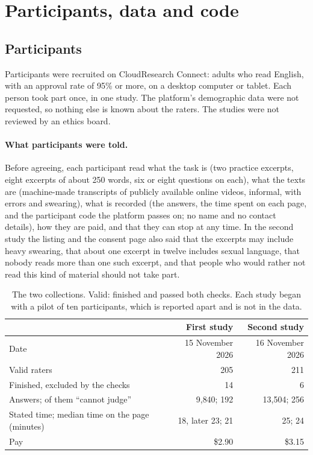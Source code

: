 \section{Participants, data and code}\label{sec:materials}

\subsection{Participants}\label{sec:participants}

Participants were recruited on CloudResearch Connect: adults who read English, with an approval rate of 95\% or
more, on a desktop computer or tablet. Each person took part once, in one study. The platform's demographic
data were not requested, so nothing else is known about the raters. The studies were not reviewed by an ethics
board.

\paragraph{What participants were told.} Before agreeing, each participant read what the task is (two practice
excerpts, eight excerpts of about 250 words, six or eight questions on each), what the texts are (machine-made
transcripts of publicly available online videos, informal, with errors and swearing), what is recorded (the
answers, the time spent on each page, and the participant code the platform passes on; no name and no contact
details), how they are paid, and that they can stop at any time. In the second study the listing and the
consent page also said that the excerpts may include heavy swearing, that about one excerpt in twelve includes
sexual language, that nobody reads more than one such excerpt, and that people who would rather not read this
kind of material should not take part.

\begin{table}[!htb]\centering
\caption{The two collections. Valid: finished and passed both checks. Each study began with a pilot of ten
participants, which is reported apart and is not in the data.}\label{tab:collections}
\small
\begin{tabular}{@{}lrr@{}}
\toprule
 & First study & Second study \\
\midrule
Date & 15 November 2026 & 16 November 2026 \\
Valid raters & 205 & 211 \\
Finished, excluded by the checks & 14 & 6 \\
Answers; of them ``cannot judge'' & 9{,}840; 192 & 13{,}504; 256 \\
Stated time; median time on the page (minutes) & 18, later 23; 21 & 25; 24 \\
Pay & \$2.90 & \$3.15 \\
\bottomrule
\end{tabular}
\end{table}

